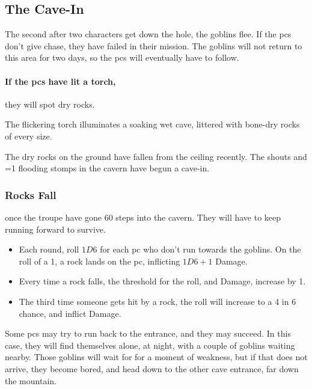 \begin{multicols}{2}

\subsection{The Cave-In}

The second after two characters get down the hole, the goblins flee.
If the \glspl{pc} don't give chase, they have failed in their mission.
The goblins will not return to this area for two days, so the \glspl{pc} will eventually have to follow.

\paragraph{If the \glspl{pc} have lit a torch,}
they will spot dry rocks.

\begin{boxtext}
  The flickering torch illuminates a soaking wet cave, littered with bone-dry rocks of every size.
\end{boxtext}

The dry rocks on the ground have fallen from the ceiling recently.
The shouts and \ifnum\value{temperature}=1 flooding \else stomps \fi in the cavern have begun a cave-in.

\subsubsection{Rocks Fall}
once the troupe have gone 60 steps into the cavern.
They will have to keep running forward to survive.

\begin{itemize}
  \item
  Each round, roll $1D6$ for each \gls{pc} who don't run towards the goblins.
  On the roll of a 1, a rock lands on the \gls{pc}, inflicting $1D6+1$ Damage.
  \item
  Every time a rock falls, the threshold for the roll, and Damage, increase by 1.
  \item
    The third time someone gets hit by a rock, the roll will increase to a 4 in 6 chance, and inflict  Damage.
\end{itemize}

\caveIn

Some \glspl{pc} may try to run back to the entrance, and they may succeed.
In this case, they will find themselves alone, at night, with a couple of goblins waiting nearby.
Those goblins will wait for  for a moment of weakness, but if that does not arrive, they become bored, and head down to the other cave entrance, far down the mountain.


\end{multicols}
